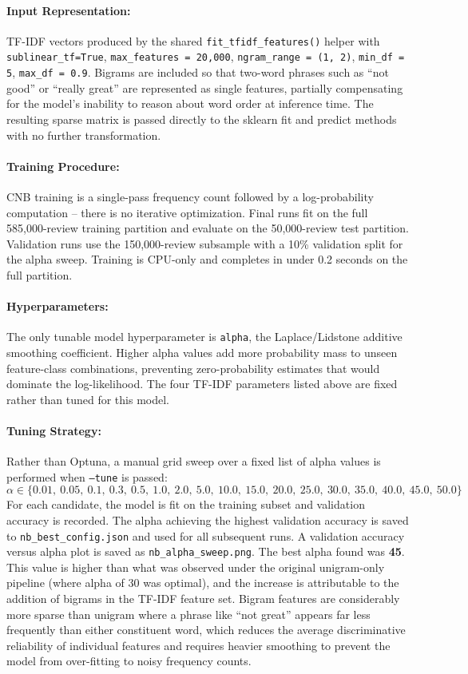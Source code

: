 \documentclass[12pt]{article}
\begin{document}
\paragraph{Input Representation:}
TF-IDF vectors produced by the shared \texttt{fit\_tfidf\_features()} helper with \texttt{sublinear\_tf=True}, \texttt{max\_features = 20{,}000}, \texttt{ngram\_range = (1, 2)}, \texttt{min\_df = 5}, \texttt{max\_df = 0.9}. Bigrams are included so that two-word phrases such as ``not good'' or ``really great'' are represented as single features, partially compensating for the model's inability to reason about word order at inference time. The resulting sparse matrix is passed directly to the sklearn fit and predict methods with no further transformation.

\paragraph{Training Procedure:}
CNB training is a single-pass frequency count followed by a log-probability computation -- there is no iterative optimization. Final runs fit on the full 585,000-review training partition and evaluate on the 50,000-review test partition. Validation runs use the 150,000-review subsample with a 10\% validation split for the alpha sweep. Training is CPU-only and completes in under 0.2 seconds on the full partition.

\paragraph{Hyperparameters:}
The only tunable model hyperparameter is \texttt{alpha}, the Laplace/Lidstone additive smoothing coefficient. Higher alpha values add more probability mass to unseen feature-class combinations, preventing zero-probability estimates that would dominate the log-likelihood. The four TF-IDF parameters listed above are fixed rather than tuned for this model.

\paragraph{Tuning Strategy:}
Rather than Optuna, a manual grid sweep over a fixed list of alpha values is performed when \texttt{--tune} is passed:
\[
\alpha \in \{0.01,\ 0.05,\ 0.1,\ 0.3,\ 0.5,\ 1.0,\ 2.0,\ 5.0,\ 10.0,\ 15.0,\ 20.0,\ 25.0,\ 30.0,\ 35.0,\ 40.0,\ 45.0,\ 50.0\}
\]
For each candidate, the model is fit on the training subset and validation accuracy is recorded. The alpha achieving the highest validation accuracy is saved to \texttt{nb\_best\_config.json} and used for all subsequent runs. A validation accuracy versus alpha plot is saved as \texttt{nb\_alpha\_sweep.png}. The best alpha found was \textbf{45}. This value is higher than what was observed under the original unigram-only pipeline (where alpha of 30 was optimal), and the increase is attributable to the addition of bigrams in the TF-IDF feature set. Bigram features are considerably more sparse than unigram where a phrase like ``not great'' appears far less frequently than either constituent word, which reduces the average discriminative reliability of individual features and requires heavier smoothing to prevent the model from over-fitting to noisy frequency counts.
\end{document}
